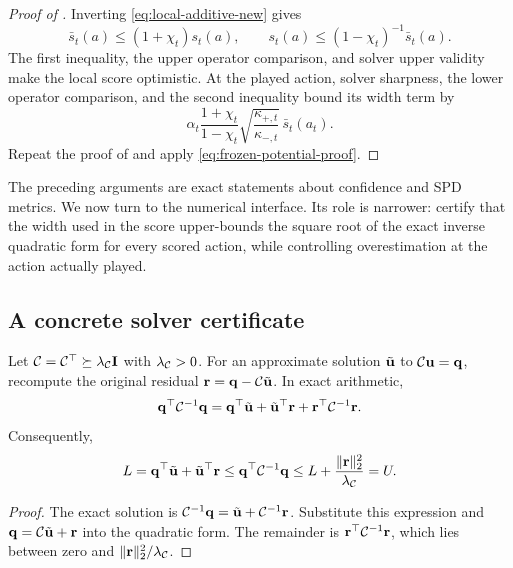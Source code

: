\begin{proof}[Proof of ]
Inverting \eqref{eq:local-additive-new} gives
\[
 \bar s_t(a)\le(1+\chi_t)s_t(a),\qquad
 s_t(a)\le(1-\chi_t)^{-1}\bar s_t(a).
\]
The first inequality, the upper operator comparison, and solver upper validity
make the local score optimistic.  At the played action, solver sharpness, the
lower operator comparison, and the second inequality bound its width term by
\[
 \alpha_t\frac{1+\chi_t}{1-\chi_t}
 \sqrt{\frac{\kappa_{+,t}}{\kappa_{-,t}}}\,\bar s_t(a_t).
\]
Repeat the proof of  and apply
\eqref{eq:frozen-potential-proof}.
\end{proof}

The preceding arguments are exact statements about confidence and SPD metrics.
We now turn to the numerical interface.  Its role is narrower: certify that the
width used in the score upper-bounds the square root of the exact inverse
quadratic form for every scored action, while controlling overestimation at the
action actually played.

\subsection{A concrete solver certificate}

\begin{lemma}
\label{lem:inverse-quadratic-certificate-new}
Let $\mathcal{C}=\mathcal{C}^\top\succeq\lambda_{\mathcal{C}}\mathbf{I}$ with
$\lambda_{\mathcal{C}}>0$.  For an approximate solution $\tilde{\mathbf{u}}$ to
$\mathcal{C}\mathbf{u}=\mathbf{q}$, recompute the original residual
$\mathbf{r}=\mathbf{q}-\mathcal{C}\tilde{\mathbf{u}}$.  In exact arithmetic,
\begin{equation}\label{eq:inverse-quadratic-identity-new}
 \mathbf{q}^\top\mathcal{C}^{-1}\mathbf{q}
 =\mathbf{q}^\top\tilde{\mathbf{u}}+\tilde{\mathbf{u}}^\top\mathbf{r}
 +\mathbf{r}^\top\mathcal{C}^{-1}\mathbf{r}.
\end{equation}
Consequently,
\begin{equation}\label{eq:inverse-quadratic-interval-new}
 L=\mathbf{q}^\top\tilde{\mathbf{u}}+\tilde{\mathbf{u}}^\top\mathbf{r}
 \le\mathbf{q}^\top\mathcal{C}^{-1}\mathbf{q}
 \le L+\frac{\|\mathbf{r}\|_2^2}{\lambda_{\mathcal{C}}}=U.
\end{equation}
\end{lemma}
\begin{proof}
The exact solution is
$\mathcal{C}^{-1}\mathbf{q}=\tilde{\mathbf{u}}+\mathcal{C}^{-1}\mathbf{r}$.  Substitute this expression and
$\mathbf{q}=\mathcal{C}\tilde{\mathbf{u}}+\mathbf{r}$ into the quadratic form.  The remainder is
$\mathbf{r}^\top\mathcal{C}^{-1}\mathbf{r}$, which lies between zero and
$\|\mathbf{r}\|_2^2/\lambda_{\mathcal{C}}$.
\end{proof}


